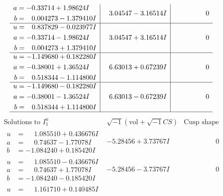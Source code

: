 \documentclass[1p]{elsarticle_modified}
\theoremstyle{definition}
\newcommand{\I}{\sqrt{-1}}
\begin{document}
$$\begin{array}{c|c|c}
\begin{aligned}
a &= -0.33714 + 1.98624 I \\
b &= \phantom{-}0.004273 - 1.379410 I\end{aligned}
 & \phantom{-}3.04547 - 3.16514 I & \phantom{-0.000000 } 0 \\ \hline\begin{aligned}
u &= \phantom{-}0.837829 - 0.023977 I \\
a &= -0.33714 - 1.98624 I \\
b &= \phantom{-}0.004273 + 1.379410 I\end{aligned}
 & \phantom{-}3.04547 + 3.16514 I & \phantom{-0.000000 } 0 \\ \hline\begin{aligned}
u &= -1.149680 + 0.182280 I \\
a &= -0.38001 + 1.36524 I \\
b &= \phantom{-}0.518344 - 1.114800 I\end{aligned}
 & \phantom{-}6.63013 + 0.67239 I & \phantom{-0.000000 } 0 \\ \hline\begin{aligned}
u &= -1.149680 - 0.182280 I \\
a &= -0.38001 - 1.36524 I \\
b &= \phantom{-}0.518344 + 1.114800 I\end{aligned}
 & \phantom{-}6.63013 - 0.67239 I & \phantom{-0.000000 } 0\\
 \hline 
 \end{array}$$\newpage$$\begin{array}{c|c|c}  
\text{Solutions to }I^u_{1}& \I (\text{vol} + \sqrt{-1}CS) & \text{Cusp shape}\\
 \hline 
\begin{aligned}
u &= \phantom{-}1.085510 + 0.436676 I \\
a &= \phantom{-}0.74637 - 1.77078 I \\
b &= -1.084240 + 0.185420 I\end{aligned}
 & -5.28456 + 3.73767 I & \phantom{-0.000000 } 0 \\ \hline\begin{aligned}
u &= \phantom{-}1.085510 - 0.436676 I \\
a &= \phantom{-}0.74637 + 1.77078 I \\
b &= -1.084240 - 0.185420 I\end{aligned}
 & -5.28456 - 3.73767 I & \phantom{-0.000000 } 0 \\ \hline\begin{aligned}
u &= \phantom{-}1.161710 + 0.140485 I \\

\end{aligned}
\end{array}$$
\end{document}
